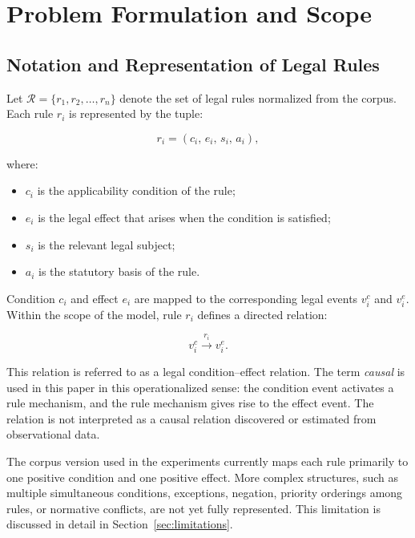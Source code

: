 \section{Problem Formulation and Scope}
\label{sec:problem}

\subsection{Notation and Representation of Legal Rules}

Let \(\mathcal{R}=\{r_1,r_2,\ldots,r_n\}\) denote the set of legal rules
normalized from the corpus. Each rule \(r_i\) is represented by the tuple:

\begin{equation}
r_i =
\left(
    c_i,\,
    e_i,\,
    s_i,\,
    a_i
\right),
\label{eq:rule}
\end{equation}

where:

\begin{itemize}
    \item \(c_i\) is the applicability condition of the rule;
    \item \(e_i\) is the legal effect that arises when the condition is
    satisfied;
    \item \(s_i\) is the relevant legal subject;
    \item \(a_i\) is the statutory basis of the rule.
\end{itemize}

Condition \(c_i\) and effect \(e_i\) are mapped to the corresponding legal
events \(v_i^{c}\) and \(v_i^{e}\). Within the scope of the model, rule
\(r_i\) defines a directed relation:

\begin{equation}
v_i^{c}
\xrightarrow{r_i}
v_i^{e}.
\end{equation}

This relation is referred to as a legal condition--effect relation. The term
\emph{causal} is used in this paper in this operationalized sense: the
condition event activates a rule mechanism, and the rule mechanism gives
rise to the effect event. The relation is not interpreted as a causal
relation discovered or estimated from observational data.

The corpus version used in the experiments currently maps each rule
primarily to one positive condition and one positive effect. More complex
structures, such as multiple simultaneous conditions, exceptions, negation,
priority orderings among rules, or normative conflicts, are not yet fully
represented. This limitation is discussed in detail in
Section~\ref{sec:limitations}.


